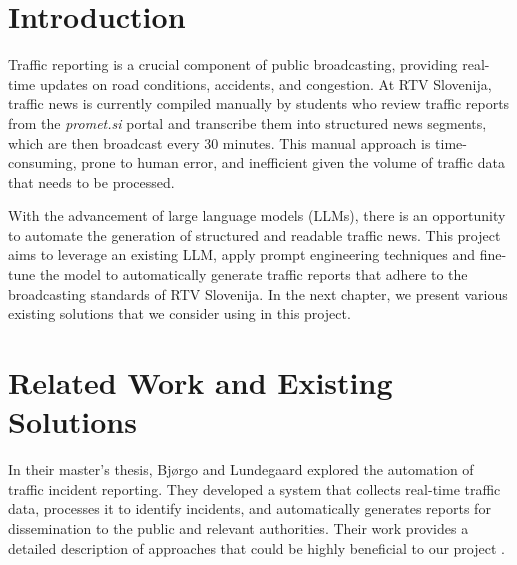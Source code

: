 \documentclass[fleqn,moreauthors,10pt]{ds_report}
\affiliation{\textit{Advisors: Slavko Žitnik}}
\begin{document}
\flushbottom 

\maketitle 

\thispagestyle{empty} 


\section*{Introduction}
Traffic reporting is a crucial component of public broadcasting, providing real-time updates on road conditions, accidents, and congestion. At RTV Slovenija, traffic news is currently compiled manually by students who review traffic reports from the \textit{promet.si} portal and transcribe them into structured news segments, which are then broadcast every 30 minutes. This manual approach is time-consuming, prone to human error, and inefficient given the volume of traffic data that needs to be processed. 

With the advancement of large language models (LLMs), there is an opportunity to automate the generation of structured and readable traffic news. This project aims to leverage an existing LLM, apply prompt engineering techniques and fine-tune the model to automatically generate traffic reports that adhere to the broadcasting standards of RTV Slovenija. In the next chapter, we present various existing solutions that we consider using in this project.

\section*{Related Work and Existing Solutions}
In their master's thesis, Bjørgo and Lundegaard explored the automation of traffic incident reporting. They developed a system that collects real-time traffic data, processes it to identify incidents, and automatically generates reports for dissemination to the public and relevant authorities. Their work provides a detailed description of approaches that could be highly beneficial to our project \cite{bjorgo2024automating}.
\end{document}
